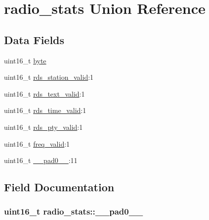 \hypertarget{unionradio__stats}{}\section{radio\+\_\+stats Union Reference}
\label{unionradio__stats}
\subsection*{Data Fields}
\begin{DoxyCompactItemize}
\item 
uint16\+\_\+t \hyperlink{unionradio__stats_aa73a55a2a5c18be853afb570f10834f1}{byte}
\item 
uint16\+\_\+t \hyperlink{unionradio__stats_a3bb5275e2bed09b614575eea4b0a4f0e}{rds\+\_\+station\+\_\+valid}\+:1
\item 
uint16\+\_\+t \hyperlink{unionradio__stats_a4a15ff60e7f0b5405742f3e277a812f5}{rds\+\_\+text\+\_\+valid}\+:1
\item 
uint16\+\_\+t \hyperlink{unionradio__stats_a21299b2eaacb96dcffe4324c347a665f}{rds\+\_\+time\+\_\+valid}\+:1
\item 
uint16\+\_\+t \hyperlink{unionradio__stats_a37e56b408b1b560ba4118df03333fed1}{rds\+\_\+pty\+\_\+valid}\+:1
\item 
uint16\+\_\+t \hyperlink{unionradio__stats_a238924d72f900f0747a57e86eedb64cf}{freq\+\_\+valid}\+:1
\item 
uint16\+\_\+t \hyperlink{unionradio__stats_a63b88649988d585155baff9da59fb43d}{\+\_\+\+\_\+pad0\+\_\+\+\_\+}\+:11
\end{DoxyCompactItemize}


\subsection{Field Documentation}
\hypertarget{unionradio__stats_a63b88649988d585155baff9da59fb43d}{}
\subsubsection[{\+\_\+\+\_\+pad0\+\_\+\+\_\+}]{\setlength{\rightskip}{0pt plus 5cm}uint16\+\_\+t radio\+\_\+stats\+::\+\_\+\+\_\+pad0\+\_\+\+\_\+}\label{unionradio__stats_a63b88649988d585155baff9da59fb43d}
\hypertarget{unionradio__stats_aa73a55a2a5c18be853afb570f10834f1}{}
